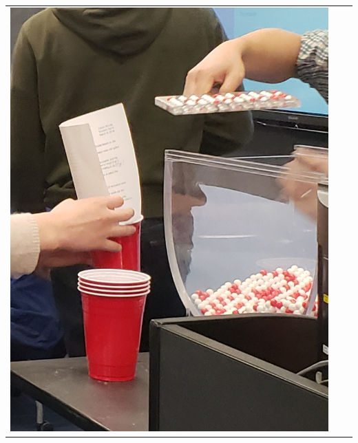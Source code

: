 \documentclass[
  letterpaper,
  DIV=11,
  numbers=noendperiod]{scrreprt}
\theoremstyle{definition}
\theoremstyle{remark}
\begin{document}
\begin{longtable}[]{@{}
  >{\raggedright\arraybackslash}p{}
  >{\raggedright\arraybackslash}p{}
  >{\raggedright\arraybackslash}p{}@{}}
\toprule\noalign{}
\endhead
\bottomrule\noalign{}
\endlastfoot
\includegraphics{images/sampling/tactile_2_a.jpg} &

\end{longtable}
\end{document}
